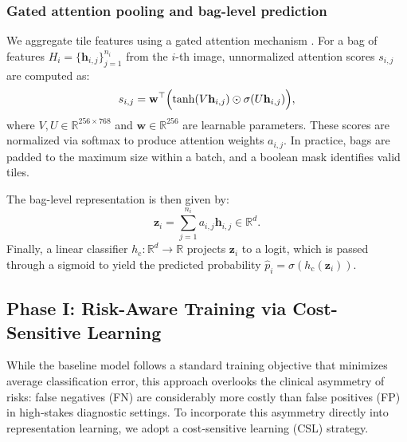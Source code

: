 \documentclass[journal]{IEEEtran}
\theoremstyle{remark}
\begin{document}
\subsubsection{Gated attention pooling and bag-level prediction}\label{S3-1-3}
We aggregate tile features using a gated attention mechanism \cite{ilse2018attention}. For a bag of features \( H_i = \{\mathbf{h}_{i,j}\}_{j=1}^{n_i} \) from the \( i \)-th image, unnormalized attention scores \( s_{i,j} \) are computed as:
\begin{equation*}
    s_{i,j} = \mathbf{w}^\top \Bigl(\tanh(V\mathbf{h}_{i,j}) \odot \sigma(U\mathbf{h}_{i,j})\Bigr),
\end{equation*}
where \( V, U \in \mathbb{R}^{256 \times 768} \) and \( \mathbf{w} \in \mathbb{R}^{256} \) are learnable parameters. These scores are normalized via softmax to produce attention weights \( a_{i,j} \). In practice, bags are padded to the maximum size within a batch, and a boolean mask identifies valid tiles.

The bag-level representation is then given by:
\begin{equation*}
    \mathbf{z}_i = \sum_{j=1}^{n_i} a_{i,j} \mathbf{h}_{i,j} \in \mathbb{R}^{d}.
\end{equation*}
Finally, a linear classifier \( h_{\mathrm{c}}: \mathbb{R}^{d} \to \mathbb{R} \) projects \( \mathbf{z}_i \) to a logit, which is passed through a sigmoid to yield the predicted probability \(\hat{p}_i = \sigma(h_{\mathrm{c}}(\mathbf{z}_i))\).

\subsection{Phase I: Risk-Aware Training via Cost-Sensitive Learning}\label{sec:phase1_method}

While the baseline model follows a standard training objective that minimizes average classification error, this approach overlooks the clinical asymmetry of risks: false negatives (FN) are considerably more costly than false positives (FP) in high‑stakes diagnostic settings. To incorporate this asymmetry directly into representation learning, we adopt a cost‑sensitive learning (CSL) strategy.
\end{document}
